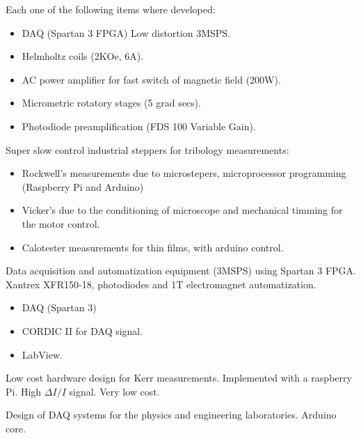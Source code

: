 \documentclass[10pt,a4paper]{altacv}
\begin{document}
Each one of the following items where developed:
\begin{itemize}
\item DAQ (Spartan 3 FPGA) Low distortion 3MSPS.
\item Helmholtz coils (2KOe, 6A).
\item AC power amplifier for fast switch of magnetic field (200W). 
\item Micrometric rotatory stages (5 grad secs). \item Photodiode preamplification (FDS 100 Variable Gain). 
\end{itemize}
\divider
{}
Super slow control industrial steppers for tribology measurements: 
\begin{itemize}
\item Rockwell's measurements due to microstepers, microprocessor programming (Raspberry Pi and Arduino)
\item Vicker's due to the conditioning of microscope and mechanical timming for the motor control.
\item Calotester measurements for thin films, with arduino control.
\end{itemize}

\newpage


Data acquisition and automatization equipment (3MSPS) using Spartan 3 FPGA. Xantrex XFR150-18,  photodiodes and 1T electromagnet automatization.
\begin{itemize}
\item DAQ (Spartan 3) 
\item CORDIC II for DAQ signal.
\item LabView.
\end{itemize}
\divider
{}
Low cost hardware design for Kerr measurements. Implemented with a raspberry Pi. High $\Delta I / I $ signal. Very low cost.
\begin{itemize}
\end{itemize}
\divider


Design of DAQ systems for the physics and engineering laboratories. Arduino core.

\end{document}
